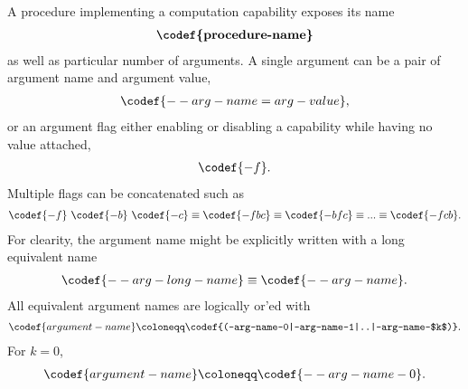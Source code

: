 
A procedure implementing a computation capability exposes its name
\begin{align*}
  \textbf{\codef{procedure-name}}
\end{align*}
as well as particular number of arguments. A single argument can be a pair of argument name and argument value,
\begin{align*}
  \codef{--arg-name=arg-value},
\end{align*}
or an argument flag either enabling or disabling a capability while having no value attached,
\begin{align*}
  \codef{-f}.
\end{align*}
Multiple flags can be concatenated such as
\begin{align*}
  \codef{-f}\ \codef{-b}\ \codef{-c} \equiv \codef{-fbc} \equiv \codef{-bfc} \equiv ... \equiv \codef{-fcb}.
\end{align*}
For clearity, the argument name might be explicitly written with a long equivalent name
\begin{align*}
  \codef{--arg-long-name} \equiv \codef{--arg-name}.
\end{align*}
All equivalent argument names are logically or'ed with
\begin{align*}
  \codef{argument-name} \coloneqq \codef{(--arg-name-0|--arg-name-1|..|--arg-name-$k$)}.
\end{align*}
For $k=0$,
\begin{align*}
  \codef{argument-name} \coloneqq \codef{--arg-name-0}.
\end{align*}

